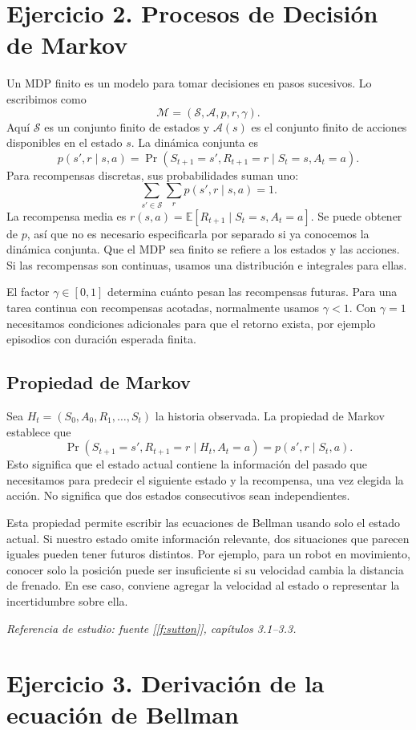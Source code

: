 \documentclass[11pt,a4paper]{article}
\newcommand{\E}{\mathbb{E}}
\newcommand{\apartado}[1]{\subsection*{#1}}
\begin{document}
\clearpage
\section{Ejercicio 2. Procesos de Decisión de Markov}

Un MDP finito es un modelo para tomar decisiones en pasos sucesivos. Lo escribimos como
\[
\mathcal{M}=(\mathcal{S},\mathcal{A},p,r,\gamma).
\]
Aquí $\mathcal{S}$ es un conjunto finito de estados y $\mathcal{A}(s)$ es el conjunto finito de acciones disponibles en el estado $s$. La dinámica conjunta es
\[
p(s',r\mid s,a)=\Pr(S_{t+1}=s',R_{t+1}=r\mid S_t=s,A_t=a).
\]
Para recompensas discretas, sus probabilidades suman uno:
\[
\sum_{s'\in\mathcal{S}}\sum_r p(s',r\mid s,a)=1.
\]
La recompensa media es $r(s,a)=\E[R_{t+1}\mid S_t=s,A_t=a]$. Se puede obtener de $p$, así que no es necesario especificarla por separado si ya conocemos la dinámica conjunta. Que el MDP sea finito se refiere a los estados y las acciones. Si las recompensas son continuas, usamos una distribución e integrales para ellas.

El factor $\gamma\in[0,1]$ determina cuánto pesan las recompensas futuras. Para una tarea continua con recompensas acotadas, normalmente usamos $\gamma<1$. Con $\gamma=1$ necesitamos condiciones adicionales para que el retorno exista, por ejemplo episodios con duración esperada finita.

\apartado{Propiedad de Markov}
Sea $H_t=(S_0,A_0,R_1,\ldots,S_t)$ la historia observada. La propiedad de Markov establece que
\[
\Pr(S_{t+1}=s',R_{t+1}=r\mid H_t,A_t=a)
=p(s',r\mid S_t,a).
\]
Esto significa que el estado actual contiene la información del pasado que necesitamos para predecir el siguiente estado y la recompensa, una vez elegida la acción. No significa que dos estados consecutivos sean independientes.

Esta propiedad permite escribir las ecuaciones de Bellman usando solo el estado actual. Si nuestro estado omite información relevante, dos situaciones que parecen iguales pueden tener futuros distintos. Por ejemplo, para un robot en movimiento, conocer solo la posición puede ser insuficiente si su velocidad cambia la distancia de frenado. En ese caso, conviene agregar la velocidad al estado o representar la incertidumbre sobre ella.

\textit{Referencia de estudio: fuente [\ref{f:sutton}], capítulos 3.1--3.3.}

\section{Ejercicio 3. Derivación de la ecuación de Bellman}
\end{document}
